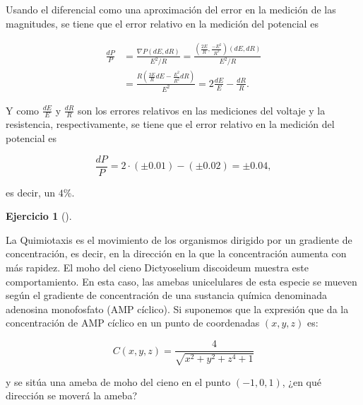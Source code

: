 \documentclass[
  spanish,
  a4paper,
]{scrreport}
\theoremstyle{definition}
\newtheorem{exercise}{Ejercicio}[chapter]
\theoremstyle{remark}
\begin{document}
\begin{tcolorbox}[enhanced jigsaw, arc=.35mm, bottomrule=.15mm, bottomtitle=1mm, breakable, colback=white, colbacktitle=quarto-callout-tip-color!10!white, colframe=quarto-callout-tip-color-frame, coltitle=black, left=2mm, leftrule=.75mm, opacityback=0, opacitybacktitle=0.6, rightrule=.15mm, title=\textcolor{quarto-callout-tip-color}{\faLightbulb}\hspace{0.5em}{Solución}, titlerule=0mm, toprule=.15mm, toptitle=1mm]

Usando el diferencial como una aproximación del error en la medición de
las magnitudes, se tiene que el error relativo en la medición del
potencial es

\begin{align*}
\frac{dP}{P}
&= \frac{\nabla P (dE, dR)}{E^2/R}
= \frac{\left(\frac{2E}{R}, \frac{-E^2}{R^2}\right)(dE, dR)}{E^2/R} \\
&= \frac{R\left(\frac{2E}{R}dE - \frac{E^2}{R^2}dR\right)}{E^2} 
= 2\frac{dE}{E} - \frac{dR}{R}.
\end{align*}

Y como \(\frac{dE}{E}\) y \(\frac{dR}{R}\) son los errores relativos en
las mediciones del voltaje y la resistencia, respectivamente, se tiene
que el error relativo en la medición del potencial es

\[
\frac{dP}{P} = 2\cdot (\pm 0.01) - (\pm 0.02) = \pm 0.04,
\]

es decir, un \(4\)\%.

\end{tcolorbox}

\begin{exercise}[]\protect\hypertarget{exr-ameba}{}\label{exr-ameba}

La Quimiotaxis es el movimiento de los organismos dirigido por un
gradiente de concentración, es decir, en la dirección en la que la
concentración aumenta con más rapidez. El moho del cieno Dictyoselium
discoideum muestra este comportamiento. En esta caso, las amebas
unicelulares de esta especie se mueven según el gradiente de
concentración de una sustancia química denominada adenosina monofosfato
(AMP cíclico). Si suponemos que la expresión que da la concentración de
AMP cíclico en un punto de coordenadas \((x,y,z)\) es:

\[
C(x,y,z) = \frac{4}{\sqrt{x^2+y^2+z^4+1}}
\]

y se sitúa una ameba de moho del cieno en el punto \((-1,0,1)\), ¿en qué
dirección se moverá la ameba?

\end{exercise}
\end{document}
